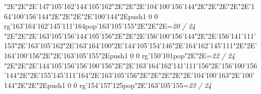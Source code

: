 \null\vfill\enskip\enskip\enskip\ipa\char"2E\enskip\enskip\enskip\ipa\char"2E\enskip\ipa\char"2E\ipa\char'147\ipa\char'105\ipa\char'162\bigskip\ipa\char'144\ipa\char'105\ipa\char'162\ipa\char"2E\enskip\enskip\enskip\ipa\char"2E\enskip\enskip\enskip\enskip\enskip\enskip\bigskip\enskip\enskip\ipa\char"2E\ipa\char'104\ipa\char'100\ipa\char'156\ipa\char'144\ipa\char"2E\enskip\ipa\char"2E\enskip\enskip\enskip\enskip\ipa\char"2E\enskip\enskip\enskip\ipa\char"2E\enskip\enskip\enskip\ipa\char"2E\ipa\char'164\ipa\char'100\ipa\char'156\ipa\char'144\bigskip\enskip\ipa\char"2E\enskip\enskip\enskip\enskip\ipa\char"2E\enskip\enskip\ipa\char"2E\enskip\enskip\enskip\ipa\char"2E\ipa\char'100\ipa\char'144\ipa\char"2E\pdfcolorstack\match push{1 0 0 rg}\ipa\char'163\ipa\char'164\ipa\char'162\ipa\char'145\ipa\char'111\ipa\char'164\pdfcolorstack\match pop{}\bigskip\ipa\char'163\ipa\char'105\ipa\char'155\ipa\char"2E\enskip\enskip\ipa\char"2E\enskip\enskip\enskip\ipa\char"2E\enskip\enskip\enskip\bigskip\vfill\footline={\hfill\tenrm\it 20 / 24}\eject
\null\vfill\enskip\enskip\enskip\ipa\char"2E\enskip\enskip\enskip\ipa\char"2E\enskip\ipa\char"2E\ipa\char'163\ipa\char'105\ipa\char'156\bigskip\ipa\char'144\ipa\char'105\ipa\char'156\ipa\char"2E\enskip\enskip\enskip\ipa\char"2E\enskip\enskip\enskip\enskip\enskip\enskip\bigskip\enskip\enskip\ipa\char"2E\ipa\char'156\ipa\char'100\ipa\char'156\ipa\char'144\ipa\char"2E\enskip\ipa\char"2E\ipa\char'156\ipa\char'141\ipa\char'111\ipa\char'153\ipa\char"2E\ipa\char'163\ipa\char'105\ipa\char'162\ipa\char"2E\ipa\char'163\ipa\char'164\ipa\char'100\ipa\char"2E\ipa\char'144\ipa\char'105\ipa\char'154\ipa\char'146\bigskip\enskip\ipa\char"2E\ipa\char'164\ipa\char'162\ipa\char'145\ipa\char'111\ipa\char"2E\enskip\enskip\ipa\char"2E\ipa\char'164\ipa\char'100\ipa\char'156\ipa\char"2E\enskip\enskip\ipa\char"2E\enskip\enskip\enskip\enskip\enskip\enskip\bigskip\ipa\char'163\ipa\char'105\ipa\char'155\ipa\char"2E\pdfcolorstack\match push{1 0 0 rg}\ipa\char'150\ipa\char'101\pdfcolorstack\match pop{}\ipa\char"2E\enskip\enskip\enskip\ipa\char"2E\enskip\enskip\enskip\bigskip\vfill\footline={\hfill\tenrm\it 22 / 24}\eject
\null\vfill\enskip\enskip\enskip\ipa\char"2E\enskip\enskip\enskip\ipa\char"2E\enskip\ipa\char"2E\ipa\char'144\ipa\char'105\ipa\char'156\bigskip\ipa\char'156\ipa\char'100\ipa\char'156\ipa\char"2E\enskip\enskip\enskip\ipa\char"2E\ipa\char'163\ipa\char'164\ipa\char'162\ipa\char'141\ipa\char'111\ipa\char'156\bigskip\enskip\enskip\ipa\char"2E\ipa\char'156\ipa\char'100\ipa\char'156\ipa\char'144\ipa\char"2E\enskip\ipa\char"2E\ipa\char'155\ipa\char'145\ipa\char'111\ipa\char'164\ipa\char"2E\ipa\char'163\ipa\char'105\ipa\char'156\ipa\char"2E\enskip\enskip\enskip\ipa\char"2E\enskip\enskip\enskip\enskip\bigskip\enskip\ipa\char"2E\enskip\enskip\enskip\enskip\ipa\char"2E\enskip\enskip\ipa\char"2E\ipa\char'104\ipa\char'100\ipa\char'163\ipa\char"2E\ipa\char'100\ipa\char'144\ipa\char"2E\enskip\enskip\enskip\enskip\enskip\enskip\bigskip\enskip\enskip\enskip\ipa\char"2E\enskip\enskip\ipa\char"2E\pdfcolorstack\match push{1 0 0 rg}\ipa\char'154\ipa\char'157\ipa\char'125\pdfcolorstack\match pop{}\ipa\char"2E\ipa\char'163\ipa\char'105\ipa\char'155\bigskip\vfill\footline={\hfill\tenrm\it 23 / 24}\eject
